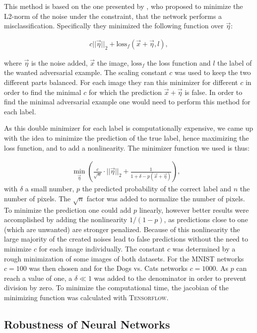 \documentclass[%
 reprint,
 amsmath,amssymb,
 aps,
]{revtex4-1}
\begin{document}
This method is based on the one presented by \citet{paperMinimize}, who proposed to minimize the L2-norm of the noise under the constraint, that the network performs a misclassification. Specifically they minimized the following function over $\vec{\eta}$:

\begin{align}
c||\vec{\eta}||_2 + \text{loss}_f (\vec{x}+\vec{\eta}, l),
\end{align}

where $\vec{\eta}$ is the noise added, $\vec{x}$ the image,  $\text{loss}_f$ the loss function and $l$ the label of the wanted adversarial example. The scaling constant $c$ was used to keep the two different parts balanced. For each image they ran this minimizer for different $c$ in order to find the minimal $c$ for which the prediction $\vec{x}+\vec{\eta}$ is false. In order to find the minimal adversarial example one would need to perform this method for each label. 

As this double minimizer for each label is computationally expensive, we came up with the idea to minimize the prediction of the true label, hence maximizing the loss function, and to add a nonlinearity. The minimizer function we used is thus:

\begin{align}
\min_{\vec{\eta}} \left( \frac{c}{\sqrt{n}} \cdot ||\vec{\eta}||_2 + \frac{1}{1 + \delta - p(\vec{x}+\vec{\eta})} \right), & \label{eq:minimize}
\end{align}
with $\delta$ a small number, $p$ the predicted probability of the correct label and $n$ the number of pixels. The $\sqrt{n}$ factor was added to normalize the number of pixels. To minimize the prediction one could add $p$ linearly, however better results were accomplished by adding the nonlinearity $1/(1-p)$, as predictions close to one (which are unwanted) are stronger penalized. Because of this nonlinearity the large majority of the created noises lead to false predictions without the need to minimize $c$ for each image individually.  The constant $c$ was determined by a rough minimization of some images of both datasets. 
For the MNIST networks $c = 100$  was then chosen and for the Dogs vs. Cats networks $c = 1000$. 
As $p$ can reach a value of one, a $\delta \ll 1$ was added to the denominator in order to prevent division by zero.
To minimize the computational time, the jacobian of the minimizing function was calculated with  \textsc{Tensorflow}.


\subsection{Robustness of Neural Networks}
\label{sec:hypothesis}
\end{document}
